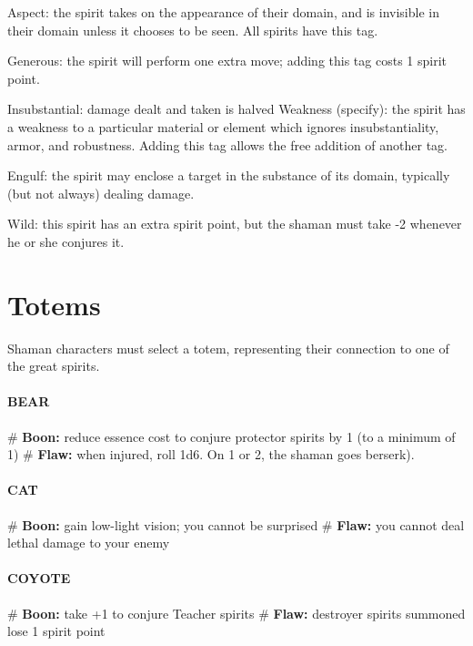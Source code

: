 Aspect: the spirit takes on the appearance of their domain, and is invisible in their domain unless it chooses to be seen. All spirits have this tag.

Generous: the spirit will perform one extra move; adding this tag costs 1 spirit point.

Insubstantial: damage dealt and taken is halved Weakness (specify): the spirit has a weakness to a particular material or element which ignores insubstantiality, armor, and robustness. Adding this tag allows the free addition of another tag.

Engulf: the spirit may enclose a target in the substance of its domain, typically (but not always) dealing damage.

Wild: this spirit has an extra spirit point, but the shaman must take -2 whenever he or she conjures it.



\section{Totems}

Shaman characters must select a totem, representing their connection to one of the great spirits.

\paragraph{BEAR}
    \begin{easylist}
        # \textbf{Boon:} reduce essence cost to conjure protector spirits by 1 (to a minimum of 1)
        # \textbf{Flaw:} when injured, roll 1d6. On 1 or 2, the shaman goes berserk).
    \end{easylist}

\paragraph{CAT}
    \begin{easylist}
        # \textbf{Boon:} gain low-light vision; you cannot be surprised
        # \textbf{Flaw:} you cannot deal lethal damage to your enemy
    \end{easylist}

\paragraph{COYOTE}
    \begin{easylist}
        # \textbf{Boon:} take +1 to conjure Teacher spirits
        # \textbf{Flaw:} destroyer spirits summoned lose 1 spirit point
    \end{easylist}

